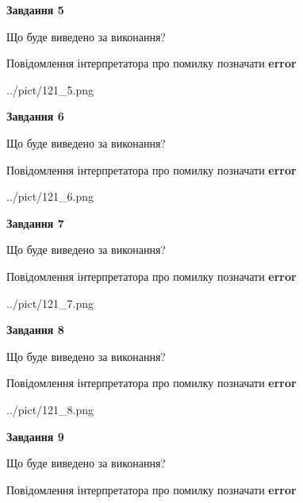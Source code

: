 \documentclass[11pt, ukrainian]{article}
\begin{document}
{\begin {large}
{\begin {center}\textbf{Завдання 5}\end {center}}\par
Що буде виведено за виконання? \par
Повідомлення інтерпретатора про помилку позначати \textbf{error}

\begin{center}
	{../pict/121_5.png}
\end{center}
\newpage

{\begin {center}\textbf{Завдання 6}\end {center}}\par
Що буде виведено за виконання? \par
Повідомлення інтерпретатора про помилку позначати \textbf{error}

\begin{center}
	{../pict/121_6.png}
\end{center}
\newpage

{\begin {center}\textbf{Завдання 7}\end {center}}\par
Що буде виведено за виконання? \par
Повідомлення інтерпретатора про помилку позначати \textbf{error}

\begin{center}
	{../pict/121_7.png}
\end{center}
\newpage

{\begin {center}\textbf{Завдання 8}\end {center}}\par
Що буде виведено за виконання? \par
Повідомлення інтерпретатора про помилку позначати \textbf{error}

\begin{center}
	{../pict/121_8.png}
\end{center}
\newpage

{\begin {center}\textbf{Завдання 9}\end {center}}\par
Що буде виведено за виконання? \par
Повідомлення інтерпретатора про помилку позначати \textbf{error}


\end{large}}
\end{document}
